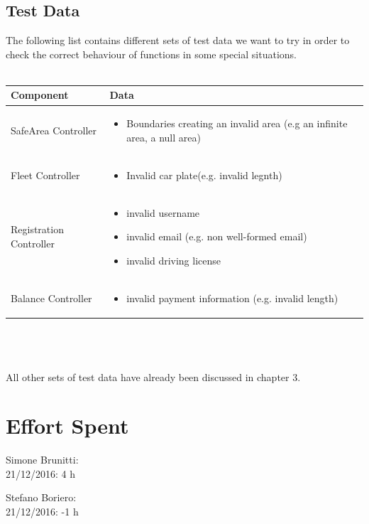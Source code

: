 \documentclass{article}
\begin{document}
\subsection{Test Data}
The following list contains different sets of test data we want to try in order to check the correct behaviour of functions in some special situations. \\\\
\begin{tabular}{ |m{5cm}|m{7cm}| }
  \hline
  \textbf{Component} & \textbf{Data} \\
  \hline
  SafeArea Controller & \begin{itemize}[noitemsep]
\item Boundaries creating an invalid area (e.g an infinite area, a null area)
\end{itemize}\\
  \hline
  Fleet Controller & \begin{itemize}[noitemsep]
\item Invalid car plate(e.g. invalid legnth)
\end{itemize}\\
  \hline
  Registration Controller & \begin{itemize}[noitemsep]
\item invalid username
\item invalid email (e.g. non well-formed email)
\item invalid driving license
\end{itemize}\\
  \hline
  Balance Controller & \begin{itemize}[noitemsep]
\item invalid payment information (e.g. invalid length)
\end{itemize}\\
  \hline
\end{tabular}
\\\\\\
All other sets of test data have already been discussed in chapter 3.
\newpage
\section{Effort Spent}
Simone Brunitti: \\
21/12/2016: 4 h

Stefano Boriero: \\
21/12/2016: -1 h
\end{document}
